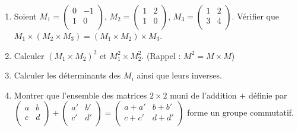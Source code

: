 \begin{frame}

\begin{miniexercice}

\begin{enumerate}
  \setcounter{enumi}{\thesaveenumi}

  \item Soient 
$M_1= \left(\begin{smallmatrix} 0 & -1 \\ 1 & 0 \\ \end{smallmatrix}\right)$,
$M_2= \left(\begin{smallmatrix} 1 & 2 \\ 1 & 0 \\ \end{smallmatrix}\right)$,
$M_3= \left(\begin{smallmatrix} 1 & 2 \\ 3 & 4 \\ \end{smallmatrix}\right)$.
Vérifier que $M_1 \times (M_2 \times M_3)= (M_1 \times M_2) \times M_3$.

  \item Calculer $(M_1\times M_2)^2$ et $M_1^2 \times M_2^2$. (Rappel : $M^2=M\times M$)

  \item Calculer les déterminants des $M_i$ ainsi que leurs inverses.

  \item Montrer que l'ensemble des matrices $2\times 2$ muni de l'addition $+$ définie par 
$\left(\begin{smallmatrix} a & b \\ c & d \\ \end{smallmatrix}\right) 
+ \left(\begin{smallmatrix} a' & b' \\ c' & d' \\ \end{smallmatrix}\right)
= \left(\begin{smallmatrix} a+a' & b+b' \\ c+c' & d+d' \\ \end{smallmatrix}\right)$ forme 
un groupe commutatif.
\end{enumerate}


\end{miniexercice}
\end{frame}



